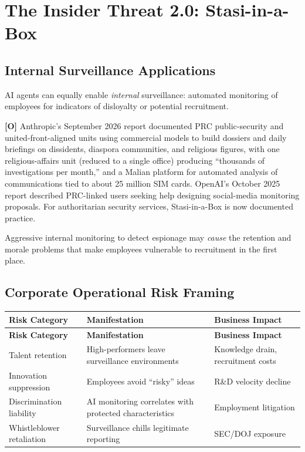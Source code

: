 \documentclass[11pt,letterpaper]{article}
\begin{document}
\section{The Insider Threat 2.0: Stasi-in-a-Box}\label{sec:stasi}

\subsection{Internal Surveillance Applications}

AI agents can equally enable \textit{internal} surveillance: automated monitoring of employees for indicators of disloyalty or potential recruitment.

\begin{criticalbox}
\textbf{[O]} Anthropic's September 2026 report documented PRC public-security and united-front-aligned units using commercial models to build dossiers and daily briefings on dissidents, diaspora communities, and religious figures, with one religious-affairs unit (reduced to a single office) producing ``thousands of investigations per month,'' and a Malian platform for automated analysis of communications tied to about 25 million SIM cards. OpenAI's October 2025 report described PRC-linked users seeking help designing social-media monitoring proposals. For authoritarian security services, Stasi-in-a-Box is now documented practice.
\end{criticalbox}

\begin{warnbox}
Aggressive internal monitoring to detect espionage may \textit{cause} the retention and morale problems that make employees vulnerable to recruitment in the first place.
\end{warnbox}

\subsection{Corporate Operational Risk Framing}

{\small
\begin{longtable}{L{3cm}L{4cm}L{5.5cm}}
\toprule
\textbf{Risk Category} & \textbf{Manifestation} & \textbf{Business Impact} \\
\midrule
\endfirsthead
\toprule
\textbf{Risk Category} & \textbf{Manifestation} & \textbf{Business Impact} \\
\midrule
\endhead
Talent retention & High-performers leave surveillance environments & Knowledge drain, recruitment costs \\*
Innovation suppression & Employees avoid ``risky'' ideas & R\&D velocity decline \\
Discrimination liability & AI monitoring correlates with protected characteristics & Employment litigation \\*
Whistleblower retaliation & Surveillance chills legitimate reporting & SEC/DOJ exposure \\
\bottomrule
\end{longtable}}
\end{document}
